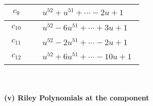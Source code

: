 \documentclass[1p]{elsarticle_modified}
\theoremstyle{definition}
\begin{document}
\begin{tabular}{m{50pt}|m{274pt}}
\hline $$\begin{aligned}c_{9}\end{aligned}$$&$\begin{aligned}
&u^{52}+u^{51}+\cdots-2 u+1
\end{aligned}$\\
\hline $$\begin{aligned}c_{10}\end{aligned}$$&$\begin{aligned}
&u^{52}-6 u^{51}+\cdots+3 u+1
\end{aligned}$\\
\hline $$\begin{aligned}c_{11}\end{aligned}$$&$\begin{aligned}
&u^{52}-2 u^{51}+\cdots-2 u+1
\end{aligned}$\\
\hline $$\begin{aligned}c_{12}\end{aligned}$$&$\begin{aligned}
&u^{52}+6 u^{51}+\cdots-10 u+1
\end{aligned}$\\
\hline
\end{tabular}\\~\\
\newpage\renewcommand{\arraystretch}{1}
\flushleft \textbf{(v) Riley Polynomials at the component}\newline \\
\end{document}
